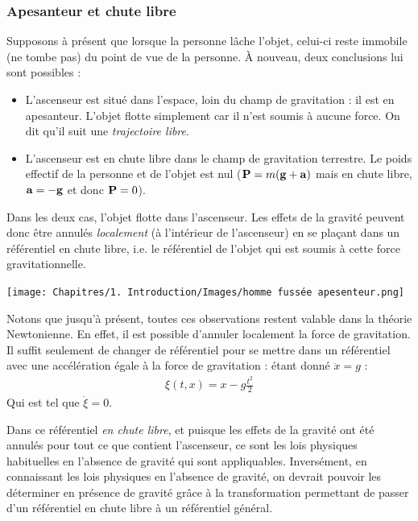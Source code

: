 \subsubsection{Apesanteur et chute libre}
Supposons à présent que lorsque la personne lâche l'objet, celui-ci reste immobile (ne tombe pas) du point de vue de la personne. À nouveau, deux conclusions lui sont possibles :
\begin{itemize}
    \item L'ascenseur est situé dans l'espace, loin du champ de gravitation : il est en apesanteur. L’objet flotte simplement car il n'est soumis à aucune force. On dit qu'il suit une \emph{trajectoire libre}.
    \item L'ascenseur est en chute libre dans le champ de gravitation terrestre. Le poids effectif de la personne et de l'objet est nul ($\bm{\mathrm{P}} = m(\bm{\mathrm{g}} + \bm{\mathrm{a}})$ mais en chute libre, $\bm{\mathrm{a}} = - \bm{\mathrm{g}}$ et donc $\bm{\mathrm{P}} = 0$).
\end{itemize}
Dans les deux cas, l'objet flotte dans l'ascenseur. Les effets de la gravité peuvent donc être annulés \emph{localement} (à l'intérieur de l'ascenseur) en se plaçant dans un référentiel en chute libre, i.e. le référentiel de l'objet qui est soumis à cette force gravitationnelle.

\begin{center}
\texttt{[image: Chapitres/1. Introduction/Images/homme fussée apesenteur.png]}
\end{center}
\begin{rmk}
    Notons que jusqu'à présent, toutes ces observations restent valable dans la théorie Newtonienne. En effet, il est possible d'annuler localement la force de gravitation. Il suffit seulement de changer de référentiel pour se mettre dans un référentiel avec une accélération égale à la force de gravitation : étant donné $\ddot{x} = g$ :
    \begin{align}
        \xi(t,x) = x - g \frac{t^2}{2}
    \end{align}
    Qui est tel que $\ddot{\xi} = 0$.
\end{rmk}
\cutebreak
Dans ce référentiel \emph{en chute libre}, et puisque les effets de la gravité ont été annulés pour tout ce que contient l'ascenseur, ce sont les lois physiques habituelles en l'absence de gravité qui sont appliquables. Inversément, en connaissant les lois physiques en l'absence de gravité, on devrait pouvoir les déterminer en présence de gravité grâce à la transformation permettant de passer d'un référentiel en chute libre à un référentiel général.
